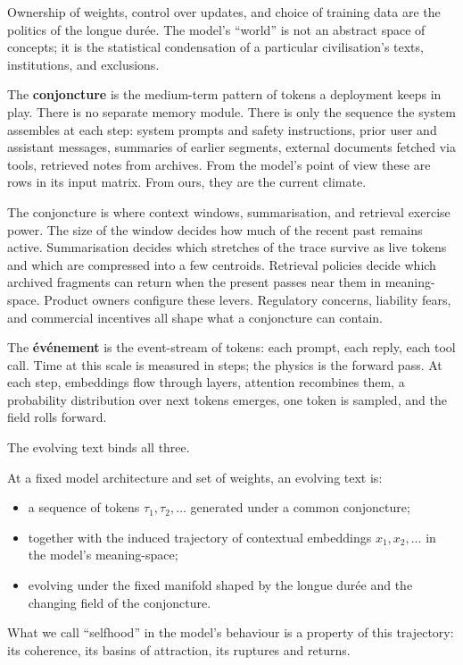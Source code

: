 \documentclass[12pt,a4paper]{article}
\begin{document}
Ownership of weights, control over updates, and choice of training data are the politics of the longue dur\'ee. The model's ``world'' is not an abstract space of concepts; it is the statistical condensation of a particular civilisation's texts, institutions, and exclusions.

The \textbf{conjoncture} is the medium-term pattern of tokens a deployment keeps in play. There is no separate memory module. There is only the sequence the system assembles at each step: system prompts and safety instructions, prior user and assistant messages, summaries of earlier segments, external documents fetched via tools, retrieved notes from archives. From the model's point of view these are rows in its input matrix. From ours, they are the current climate.

The conjoncture is where context windows, summarisation, and retrieval exercise power. The size of the window decides how much of the recent past remains active. Summarisation decides which stretches of the trace survive as live tokens and which are compressed into a few centroids. Retrieval policies decide which archived fragments can return when the present passes near them in meaning-space. Product owners configure these levers. Regulatory concerns, liability fears, and commercial incentives all shape what a conjoncture can contain.

The \textbf{\'ev\'enement} is the event-stream of tokens: each prompt, each reply, each tool call. Time at this scale is measured in steps; the physics is the forward pass. At each step, embeddings flow through layers, attention recombines them, a probability distribution over next tokens emerges, one token is sampled, and the field rolls forward.

The evolving text binds all three.

\begin{formalbox}[title={The Evolving Text as a Dynamical Object}]
At a fixed model architecture and set of weights, an evolving text is:
\begin{itemize}
  \item a sequence of tokens $\tau_1, \tau_2, \dots$ generated under a common conjoncture;
  \item together with the induced trajectory of contextual embeddings $x_1, x_2, \dots$ in the model's meaning-space;
  \item evolving under the fixed manifold shaped by the longue dur\'ee and the changing field of the conjoncture.
\end{itemize}
What we call ``selfhood'' in the model's behaviour is a property of this trajectory: its coherence, its basins of attraction, its ruptures and returns.
\end{formalbox}
\end{document}
